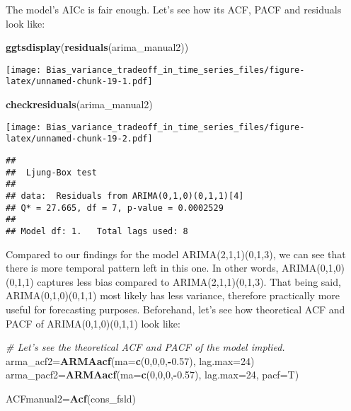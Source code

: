 \documentclass[
]{article}
\newenvironment{Shaded}{\begin{snugshade}}{\end{snugshade}}
\newcommand{\CommentTok}[1]{\textcolor[rgb]{0.56,0.35,0.01}{\textit{#1}}}
\newcommand{\DataTypeTok}[1]{\textcolor[rgb]{0.13,0.29,0.53}{#1}}
\newcommand{\DecValTok}[1]{\textcolor[rgb]{0.00,0.00,0.81}{#1}}
\newcommand{\FloatTok}[1]{\textcolor[rgb]{0.00,0.00,0.81}{#1}}
\newcommand{\KeywordTok}[1]{\textcolor[rgb]{0.13,0.29,0.53}{\textbf{#1}}}
\newcommand{\NormalTok}[1]{#1}
\newcommand{\OperatorTok}[1]{\textcolor[rgb]{0.81,0.36,0.00}{\textbf{#1}}}
\begin{document}
The model's AICc is fair enough. Let's see how its ACF, PACF and
residuals look like:

\begin{Shaded}
\begin{Highlighting}[]
\KeywordTok{ggtsdisplay}\NormalTok{(}\KeywordTok{residuals}\NormalTok{(arima_manual2))}
\end{Highlighting}
\end{Shaded}

\texttt{[image: Bias\_variance\_tradeoff\_in\_time\_series\_files/figure-latex/unnamed-chunk-19-1.pdf]}

\begin{Shaded}
\begin{Highlighting}[]
\KeywordTok{checkresiduals}\NormalTok{(arima_manual2) }
\end{Highlighting}
\end{Shaded}

\texttt{[image: Bias\_variance\_tradeoff\_in\_time\_series\_files/figure-latex/unnamed-chunk-19-2.pdf]}

\begin{verbatim}
## 
##  Ljung-Box test
## 
## data:  Residuals from ARIMA(0,1,0)(0,1,1)[4]
## Q* = 27.665, df = 7, p-value = 0.0002529
## 
## Model df: 1.   Total lags used: 8
\end{verbatim}

Compared to our findings for the model ARIMA(2,1,1)(0,1,3), we can see
that there is more temporal pattern left in this one. In other words,
ARIMA(0,1,0)(0,1,1) captures less bias compared to ARIMA(2,1,1)(0,1,3).
That being said, ARIMA(0,1,0)(0,1,1) most likely has less variance,
therefore practically more useful for forecasting purposes. Beforehand,
let's see how theoretical ACF and PACF of ARIMA(0,1,0)(0,1,1) look like:

\begin{Shaded}
\begin{Highlighting}[]
\CommentTok{# Let's see the theoretical ACF and PACF of the model implied.}
\NormalTok{arma_acf2=}\KeywordTok{ARMAacf}\NormalTok{(}\DataTypeTok{ma=}\KeywordTok{c}\NormalTok{(}\DecValTok{0}\NormalTok{,}\DecValTok{0}\NormalTok{,}\DecValTok{0}\NormalTok{,}\OperatorTok{-}\FloatTok{0.57}\NormalTok{), }\DataTypeTok{lag.max=}\DecValTok{24}\NormalTok{)}
\NormalTok{arma_pacf2=}\KeywordTok{ARMAacf}\NormalTok{(}\DataTypeTok{ma=}\KeywordTok{c}\NormalTok{(}\DecValTok{0}\NormalTok{,}\DecValTok{0}\NormalTok{,}\DecValTok{0}\NormalTok{,}\OperatorTok{-}\FloatTok{0.57}\NormalTok{), }\DataTypeTok{lag.max=}\DecValTok{24}\NormalTok{, }\DataTypeTok{pacf=}\NormalTok{T)}

\NormalTok{ACFmanual2=}\KeywordTok{Acf}\NormalTok{(cons_fsld)}
\end{Highlighting}
\end{Shaded}
\end{document}
